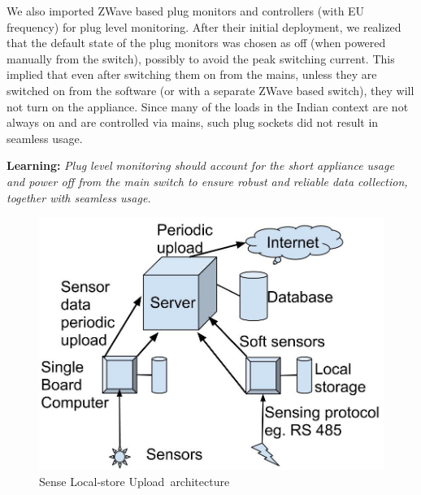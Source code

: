 \documentclass[10pt]{sensys-proc}
\newcommand{\paradigms}{Sense Local-store Upload~}
\begin{document}
We also imported ZWave based plug monitors and controllers (with EU frequency) for plug level monitoring. After their initial deployment, we realized that the default state of the plug monitors was chosen as off (when powered manually from the switch), possibly to avoid the peak switching current. This implied that even after switching them on from the mains, unless they are switched on from the software (or with a separate ZWave based switch), they will not turn on the appliance. Since many of the loads in the Indian context are not always on and are controlled via mains, such plug sockets did not result in seamless usage. 

\textbf{Learning:} \emph{Plug level monitoring should account for the short appliance usage and power off from the main switch to ensure robust and reliable data collection, together with seamless usage.}



\begin{figure}

\centering \includegraphics[scale=0.12]{./figures/architecture.jpg}
\vspace{-2mm}
\caption{\paradigms architecture}
\vspace{-2mm}
\label{fig:architecture}
\end{figure}

\vspace{-1mm}
\end{document}
